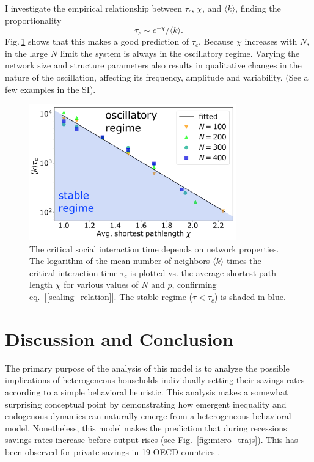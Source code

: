 I investigate the empirical relationship between $\tau_c$, $\chi$, and $\langle k \rangle$, finding the proportionality
\begin{equation}
\tau_c \sim e^{-\chi} / \langle k \rangle.
\label{scaling_relation}
\end{equation}  
Fig.\,\ref{taucrit} shows that this makes a good prediction of $\tau_{c}$.  Because $\chi$ increases with $N$, in the large $N$ limit the system is always in the oscillatory regime. Varying the network size and structure parameters also results in qualitative changes in the nature of the oscillation, affecting its frequency, amplitude and variability.  (See a few examples in the SI).

\begin{figure}[t]
     \centering
       \includegraphics[width=0.8\textwidth]
       {figures/fig4.pdf}
	\caption{{The critical social interaction time depends on network properties.}
	The logarithm of the mean number of neighbors $\langle k \rangle$  times the critical interaction time $\tau_{c}$ is plotted vs. the average shortest path length $\chi$ for various values of $N$ and $p$, confirming eq.~[\ref{scaling_relation}]. The stable regime ($\tau \! < \! \tau_{c}$) is shaded in blue. 
   \label{taucrit}}
\end{figure}

\section{Discussion and Conclusion}

The primary purpose of the analysis of this model is to analyze the possible implications of heterogeneous households individually setting their savings rates according to a simple behavioral heuristic. This analysis makes a somewhat surprising conceptual point by demonstrating how emergent inequality and endogenous dynamics can naturally emerge from a heterogeneous behavioral model. Nonetheless, this model makes the prediction that during recessions savings rates increase before output rises (see Fig.~\ref{fig:micro_trajs}).
This has been %
observed for private savings in 19 OECD countries \citep{adema2015business}. 

